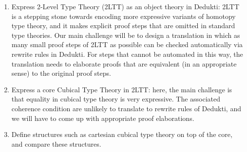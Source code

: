 \begin{enumerate}
\item Express 2-Level Type Theory (2LTT) as an object theory in Dedukti: 2LTT is
  a stepping stone towards encoding more expressive variants of homotopy type
  theory, and it makes explicit proof steps that are omitted in standard type
  theories. Our main challenge will be to design a translation in which as many
  small proof steps of 2LTT as possible can be checked automatically via rewrite
  rules in Dedukti. For steps that cannot be automated in this way, the
  translation needs to elaborate proofs that are equivalent (in an appropriate
  sense) to the original proof steps.
\item Express a core Cubical Type Theory in 2LTT: here, the main challenge is
  that equality in cubical type theory is very expressive. The associated
  coherence condition are unlikely to translate to rewrite rules of Dedukti, and
  we will have to come up with appropriate proof elaborations.
\item Define structures such as cartesian cubical type theory on top of the
  core, and compare these structures.
\end{enumerate}